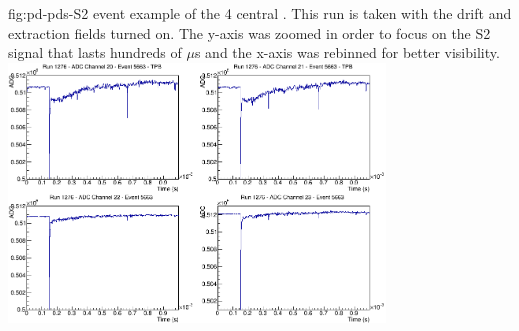 \begin{dunefigure}{fig:pd-pds-S2} { event example of the 4 central . %
This run is taken with the drift and extraction fields turned on. %
The y-axis was zoomed in order to focus on the S2 signal that lasts hundreds of $\mu$s and the x-axis was rebinned for better visibility.}
\includegraphics[width=0.75\textwidth]{graphics/dppd_S2.png}
\end{dunefigure}
